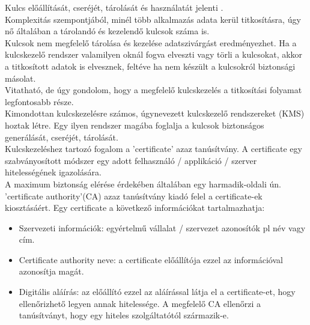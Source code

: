 Kulcs előállítását, cseréjét, tárolását és használatát jelenti \cite{rafaeli2003survey}.
\vspace{5pt} \\Komplexitás szempontjából, minél több alkalmazás adata kerül titkosításra, úgy nő általában a tárolandó és kezelendő kulcsok száma is.
\vspace{5pt} \\Kulcsok nem megfelelő tárolása és kezelése adatszivárgást eredményezhet. Ha a kulcskezelő rendszer valamilyen oknál fogva elveszti vagy törli a kulcsokat, akkor a titkosított adatok is elvesznek, feltéve ha nem készült a kulcsokról biztonsági másolat.
\vspace{5pt} \\Vitatható, de úgy gondolom, hogy a megfelelő kulcskezelés a titkosítási folyamat legfontosabb része.
\vspace{5pt} \\Kimondottan kulcskezelésre számos, úgynevezett kulcskezelő rendszereket (KMS) hoztak létre. Egy ilyen rendszer magába foglalja a kulcsok biztonságos generálását, cseréjét, tárolását.
\vspace{5pt} \\Kulcskezeléshez tartozó fogalom a ’certificate’ azaz tanúsítvány. A certificate egy szabványosított módszer egy adott felhasználó / applikáció / szerver hitelességének igazolására.
\vspace{5pt} \\A maximum biztonság elérése érdekében általában egy harmadik-oldali ún. ’certificate authority’(CA) azaz tanúsítvány kiadó felel a certificate-ek kiosztásáért. Egy certificate a következő információkat tartalmazhatja:
\begin{itemize}
	\item Szervezeti információk: egyértelmű vállalat / szervezet azonosítók pl név vagy cím.
	\item Certificate authority neve: a certificate előállítója ezzel az információval azonosítja magát.
	\item Digitális aláírás: az előállító ezzel az aláírással látja el a certificate-et, hogy ellenőrizhető legyen annak hitelessége. A megfelelő CA ellenőrzi a tanúsítványt, hogy egy hiteles szolgáltatótól származik-e.
\end{itemize}

